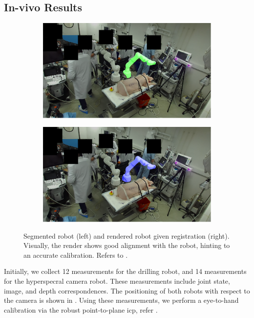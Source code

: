 \subsection{In-vivo Results}
\label{c1:sec:in_vivo_results}
\begin{figure}[tb]
    \centering
    \begin{subfigure}[b]{0.49\textwidth}
        \centering
        \includegraphics[width=\textwidth]{chapter_1/img/left_mask_overlay_0_anonymized.png}
    \end{subfigure}
    \begin{subfigure}[b]{0.49\textwidth}
        \includegraphics[width=\textwidth]{chapter_1/img/left_render_0_anonymized.png}
    \end{subfigure}
    \caption{Segmented robot (left) and rendered robot given registration (right). Visually, the render shows good alignment with the robot, hinting to an accurate calibration. Refers to .}
    \label{c1:fig:in_vivo_results}
\end{figure}
Initially, we collect 12 measurements for the drilling robot, and 14 measurements for the hyperspecral camera robot. These measurements include joint state, image, and depth correspondences. The positioning of both robots with respect to the camera is shown in . Using these measurements, we perform a eye-to-hand calibration via the robust point-to-plane \gls{icp}, refer . 

